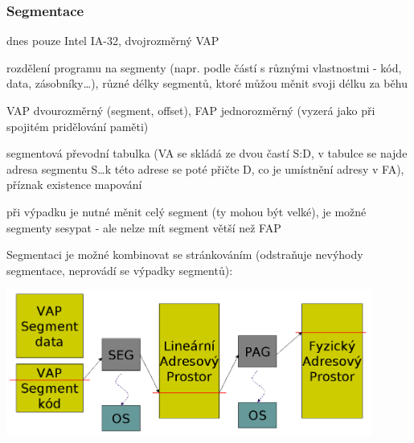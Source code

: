 \subsubsection*{Segmentace}
dnes pouze Intel IA-32, dvojrozměrný VAP
\begin{pitemize}
	\item rozdělení programu na segmenty (napr. podle částí s různými vlastnostmi - kód, data, zásobníky\dots), různé délky segmentů, ktoré můžou měnit svoji délku za běhu
	\item VAP dvourozměrný (segment, offset), FAP jednorozměrný (vyzerá jako při spojitém pridělování paměti)
	\item segmentová převodní tabulka (VA se skládá ze dvou častí S:D, v tabulce se najde adresa segmentu S\dots k této adrese se poté přičte D, co je umístnění adresy v FA), příznak existence mapování
	\item při výpadku je nutné měnit celý segment (ty mohou být velké), je možné segmenty sesypat - ale nelze mít segment větší než FAP
\end{pitemize}

Segmentaci je možné kombinovat se stránkováním (odstraňuje nevýhody segmentace, neprovádí se výpadky segmentů):
\par \begin{center}\includegraphics[width=12cm]{informatika/operacne_systemy_a_hw/obrazky/segmentace-a-strankovani.png}\end{center}
